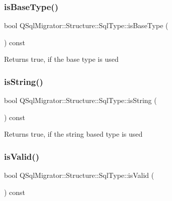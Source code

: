 \subsubsection{\texorpdfstring{is\+Base\+Type()}{isBaseType()}}
{\footnotesize\ttfamily bool Q\+Sql\+Migrator\+::\+Structure\+::\+Sql\+Type\+::is\+Base\+Type (\begin{DoxyParamCaption}{ }\end{DoxyParamCaption}) const}

\begin{DoxyReturn}{Returns}
true, if the base type is used 
\end{DoxyReturn}
\mbox{\label{class_q_sql_migrator_1_1_structure_1_1_sql_type_ac615ae6908ecf48f55486a4746c26ce3}} 
\subsubsection{\texorpdfstring{is\+String()}{isString()}}
{\footnotesize\ttfamily bool Q\+Sql\+Migrator\+::\+Structure\+::\+Sql\+Type\+::is\+String (\begin{DoxyParamCaption}{ }\end{DoxyParamCaption}) const}

\begin{DoxyReturn}{Returns}
true, if the string based type is used 
\end{DoxyReturn}
\mbox{\label{class_q_sql_migrator_1_1_structure_1_1_sql_type_a51e3974a6b29b47dee30e7597aa3a08b}} 
\subsubsection{\texorpdfstring{is\+Valid()}{isValid()}}
{\footnotesize\ttfamily bool Q\+Sql\+Migrator\+::\+Structure\+::\+Sql\+Type\+::is\+Valid (\begin{DoxyParamCaption}{ }\end{DoxyParamCaption}) const}

